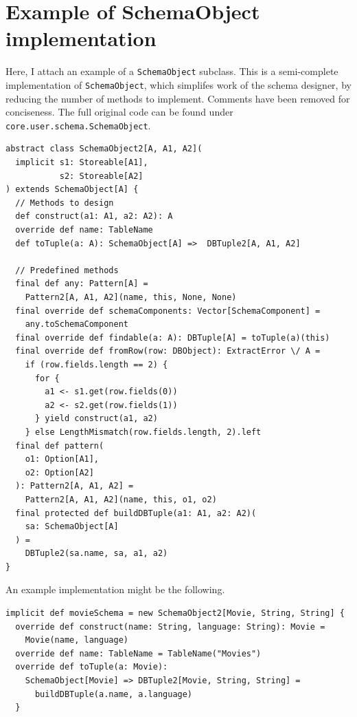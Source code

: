 \documentclass[12pt,a4paper,twoside,openright]{report}
\newcommand\codeName[1]{\texttt{#1}}
\renewcommand{\baselinestretch}{1.1}    %
\begin{document}
\chapter{Example of SchemaObject implementation}
\label{SchemaObjectDemo}
Here, I attach an example of a \codeName{SchemaObject} subclass. This is a semi-complete implementation of \codeName{SchemaObject}, which simplifes work of the schema designer, by reducing the number of methods to implement. Comments have been removed for conciseness. The full original code can be found under \codeName{core.user.schema.SchemaObject}.

\renewcommand{\baselinestretch}{0.8}
\begin{framed}
\begin{verbatim}
abstract class SchemaObject2[A, A1, A2](
  implicit s1: Storeable[A1],
           s2: Storeable[A2]
) extends SchemaObject[A] {
  // Methods to design
  def construct(a1: A1, a2: A2): A
  override def name: TableName
  def toTuple(a: A): SchemaObject[A] =>  DBTuple2[A, A1, A2]

  // Predefined methods
  final def any: Pattern[A] =
    Pattern2[A, A1, A2](name, this, None, None)
  final override def schemaComponents: Vector[SchemaComponent] = 
    any.toSchemaComponent
  final override def findable(a: A): DBTuple[A] = toTuple(a)(this)
  final override def fromRow(row: DBObject): ExtractError \/ A =
    if (row.fields.length == 2) {
      for {
        a1 <- s1.get(row.fields(0))
        a2 <- s2.get(row.fields(1))
      } yield construct(a1, a2)
    } else LengthMismatch(row.fields.length, 2).left
  final def pattern(
    o1: Option[A1],
    o2: Option[A2]
  ): Pattern2[A, A1, A2] =
    Pattern2[A, A1, A2](name, this, o1, o2)
  final protected def buildDBTuple(a1: A1, a2: A2)(
    sa: SchemaObject[A]
  ) =
    DBTuple2(sa.name, sa, a1, a2)
}
\end{verbatim}
\end{framed}
\renewcommand{\baselinestretch}{1.1}
An example implementation might be the following.

\renewcommand{\baselinestretch}{0.8}
\begin{framed}
\begin{verbatim}
implicit def movieSchema = new SchemaObject2[Movie, String, String] {
  override def construct(name: String, language: String): Movie =
    Movie(name, language)
  override def name: TableName = TableName("Movies")
  override def toTuple(a: Movie):
    SchemaObject[Movie] => DBTuple2[Movie, String, String] =
      buildDBTuple(a.name, a.language)
  }
\end{verbatim}
\end{framed}
\renewcommand{\baselinestretch}{1.1}
\end{document}
